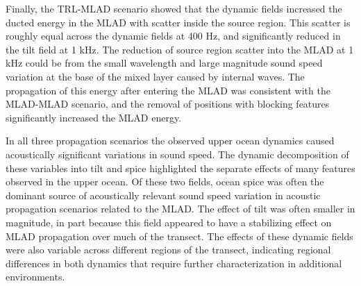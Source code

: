 \documentclass[preprint,NumberedRefs]{JASA}
\begin{document}
Finally, the TRL-MLAD scenario showed that the dynamic fields increased the ducted energy in the MLAD with scatter inside the source region. This scatter is roughly equal across the dynamic fields at 400 Hz, and significantly reduced in the tilt field at 1 kHz. The reduction of source region scatter into the MLAD at 1 kHz could be from the small wavelength and large magnitude sound speed variation at the base of the mixed layer caused by internal waves. The propagation of this energy after entering the MLAD was consistent with the MLAD-MLAD scenario, and the removal of positions with blocking features significantly increased the MLAD energy.

In all three propagation scenarios the observed upper ocean dynamics caused acoustically significant variations in sound speed. The dynamic decomposition of these variables into tilt and spice highlighted the separate effects of many features observed in the upper ocean. Of these two fields, ocean spice was often the dominant source of acoustically relevant sound speed variation in acoustic propagation scenarios related to the MLAD. The effect of tilt was often smaller in magnitude, in part because this field appeared to have a stabilizing effect on MLAD propagation over much of the transect. The effects of these dynamic fields were also variable across different regions of the transect, indicating regional differences in both dynamics that require further characterization in additional environments.




\end{document}
